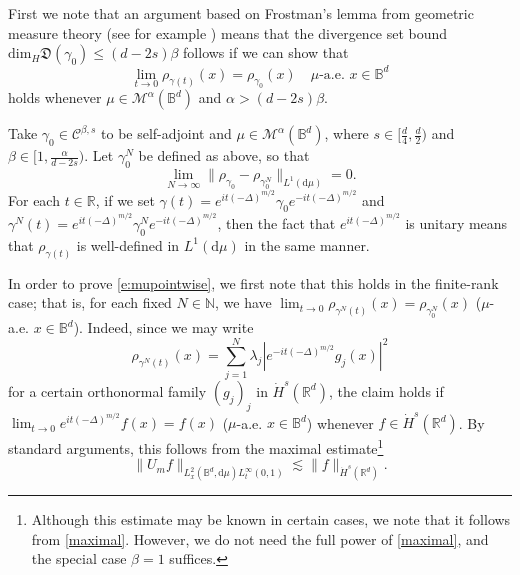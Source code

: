 \documentclass[a4paper]{amsart}
\numberwithin{equation}{section}%
\theoremstyle{plain}%
\theoremstyle{definition}
\theoremstyle{remark}%
\def\d{\mathrm{d}}
\def\dim{\mathrm{dim}}
\begin{document}
First we note that an argument based on Frostman's lemma from geometric measure theory (see for example \cite{BBCR, CL}) means that the divergence set bound $\dim_H\mathfrak D(\gamma_0) \leq (d-2s)\beta$ follows if we can show that
\begin{equation} \label{e:mupointwise}
\lim_{t\to0} \rho_{\gamma(t)}(x)
=
\rho_{\gamma_0}(x)\quad \text{$\mu$-a.e. $x \in \mathbb{B}^d$}
\end{equation}
holds whenever $\mu \in \mathcal{M}^\alpha(\mathbb{B}^d)$ and $\alpha > (d-2s)\beta$.

Take $\gamma_0 \in \mathcal{C}^{\beta,s}$ to be self-adjoint and $\mu \in \mathcal{M}^\alpha(\mathbb{B}^d)$, where $s \in [\frac{d}{4},\frac{d}{2})$ and $\beta \in [1,\frac{\alpha}{d - 2s})$. Let $\gamma_0^N$ be defined as above, so that 
\begin{equation}
    \label{est:DensityConvergence}
  \lim_{N \to \infty}  \| \rho_{\gamma_0} - \rho_{\gamma_0^N} \|_{L^1(\d \mu)} =0.
\end{equation}
For each $t \in \mathbb{R}$, if we set $\gamma(t) = e^{it (-\Delta)^{m/2}} \gamma_0 e^{- it (-\Delta)^{m/2}}$ and $\gamma^N (t) = e^{it (-\Delta)^{m/2}} \gamma_0^N e^{- it (-\Delta)^{m/2}}$, then the fact that $e^{it (-\Delta)^{m/2}}$ is unitary means that $\rho_{\gamma(t)}$ is well-defined in $L^1(\d \mu)$ in the same manner.

In order to prove \eqref{e:mupointwise}, we first note that this holds in the finite-rank case; that is, for each fixed $N \in \mathbb{N}$, we have $\lim_{t \to 0} \rho_{\gamma^N(t)}(x) = \rho_{\gamma_0^N}(x)$ ($\mu$-a.e. $x \in \mathbb{B}^d$). Indeed, since we may write
\[
\rho_{\gamma^N(t)}(x) = \sum_{j=1}^N \lambda_j |e^{-it(-\Delta)^{m/2}}g_j (x)|^2
\]
for a certain orthonormal family $(g_j)_j$ in $\dot{H}^s(\mathbb{R}^d)$, the claim holds if $\lim_{t \to 0} e^{it(-\Delta)^{m/2}} f(x) = f(x)$ ($\mu$-a.e. $x \in \mathbb{B}^d$) whenever $f \in \dot{H}^s(\mathbb{R}^d)$. By standard arguments, this follows from the maximal estimate\footnote{Although this estimate may be known in certain cases, we note that it follows from \eqref{maximal}. However, we do not need the full power of \eqref{maximal}, and the special case $\beta = 1$ suffices.}
\begin{equation} \label{e:singlefunctionmaximal}
\|U_m f\|_{L_x^2(\mathbb B^d,\d\mu)L_t^\infty(0,1)} \lesssim \|f\|_{\dot{H}^s(\mathbb{R}^d)}.
\end{equation}
\end{document}
